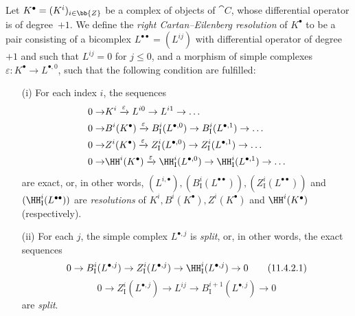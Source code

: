 \begin{env}[11.4.2]
\label{0.11.4.2}
Let $K^\bullet = (K^i)_{i\in\bb{Z}}$ be a complex of objects of $\cat{C}$, whose differential operator is of degree~$+1$.
We define the \emph{right Cartan--Eilenberg resolution} of $K^\bullet$ to be a pair consisting of a bicomplex $L^{\bullet\bullet} = (L^{ij})$ with differential operator of degree~$+1$ and such that $L^{ij}=0$ for $j\leq 0$, and a morphism of simple complexes $\varepsilon: K^\bullet \rightarrow L^{\bullet, 0}$, such that the following condition are fulfilled:
\begin{enumerate}
  \item[(i)] For each index $i$, the sequences
    \[
      \begin{aligned}
        0 \rightarrow
        & K^i
        \xrightarrow{\varepsilon} L^{i0}
        \rightarrow L^{i1}
        \rightarrow \ldots
      \\0 \rightarrow
        & B^i(K^\bullet)
        \xrightarrow{\varepsilon} B_\mathrm{I}^i(L^{\bullet,0})
        \rightarrow B_\mathrm{I}^i(L^{\bullet,1})
        \rightarrow \ldots
      \\0 \rightarrow
        & Z^i(K^\bullet)
        \xrightarrow{\varepsilon} Z_\mathrm{I}^i(L^{\bullet,0})
        \rightarrow Z_\mathrm{I}^i(L^{\bullet,1})
        \rightarrow \ldots
      \\0 \rightarrow
        & \HH^i(K^\bullet)
        \xrightarrow{\varepsilon} \HH_\mathrm{I}^i(L^{\bullet,0})
        \rightarrow \HH_\mathrm{I}^i(L^{\bullet,1})
        \rightarrow \ldots
      \end{aligned}
    \]
    are exact, or, in other words, $(L^{i,\bullet}), (B_\mathrm{I}^i(L^{\bullet\bullet})), (Z_\mathrm{I}^i(L^{\bullet\bullet}))$ and $(\HH_\mathrm{I}^i(L^{\bullet\bullet}))$ are \emph{resolutions} of $K^i, B^i(K^\bullet), Z^i(K^\bullet)$ and $\HH^i(K^\bullet)$ (respectively).
  \item[(ii)] For each $j$, the simple complex $L^{\bullet, j}$ is \emph{split}, or, in other words, the exact sequences
    \[
      \label{0.11.4.2.1}
      0 \rightarrow B_\mathrm{I}^i(L^{\bullet,j}) \rightarrow Z_\mathrm{I}^i(L^{\bullet,j}) \rightarrow \HH_\mathrm{I}^i(L^{\bullet,j}) \rightarrow 0
      \tag{11.4.2.1}
    \]
    \[
      \label{0.11.4.2.2}
      0 \rightarrow Z_\mathrm{I}^i(L^{\bullet,j}) \rightarrow L^{ij} \rightarrow B_\mathrm{I}^{i+1}(L^{\bullet,j}) \rightarrow 0
      \tag{11.4.2.2}
    \]
    are \emph{split}.
\end{enumerate}


\end{env}
